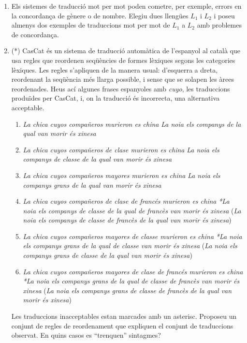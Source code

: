 \begin{enumerate}
\item Els sistemes de traducció mot per mot poden cometre, per
  exemple, errors en la concordança de gènere o de nombre.  Elegiu
  dues llengües $L_1$ i $L_2$ i poseu almenys dos exemples de
  traduccions mot per mot de $L_1$ a $L_2$ amb problemes de
  concordança.

\item (*) \label{ex:cascat} CasCat és un sistema de traducció
  automàtica de l'espanyol al català que usa regles que reordenen
  seqüències de formes lèxiques segons les categories lèxiques. Les
  regles s'apliquen de la manera usual: d'esquerra a dreta, reordenant
  la seqüència més llarga possible, i sense que se solapen les àrees
  reordenades.  Heus ací algunes frases espanyoles amb {\em cuyo}, les
  traduccions produïdes per CasCat, i, on la traducció és incorrecta,
  una alternativa acceptable.
  \begin{enumerate}
  \item \emph{La chica cuyos compañeros murieron es china} \newline
    {\em La noia els companys de la qual van morir és xinesa}
  \item \emph{La chica cuyos compañeros de clase murieron es china}
    \newline \emph{La noia els companys de classe de la qual van morir
      és xinesa}
  \item \emph{La chica cuyos compañeros mayores murieron es china}
    \newline \emph{La noia els companys grans de la qual van morir és
      xinesa}
  \item \emph{La chica cuyos compañeros de clase de francés murieron
      es china} \newline \emph{*La noia els companys de classe de la
      qual de francès van morir és xinesa} \newline (\emph{La noia els
      companys de classe de francès de la qual van morir és xinesa})
  \item \emph{La chica cuyos compañeros mayores de classe murieron es
      china} \newline \emph{*La noia els companys grans de la qual de
      classe van morir és xinesa} \newline (\emph{La noia els companys
      grans de classe de la qual van morir és xinesa})
  \item \emph{La chica cuyos compañeros mayores de clase de francés
      murieron es china} \newline \emph{*La noia els companys grans de
      la qual de classe de francès van morir és xinesa} \newline
    (\emph{La noia els companys grans de classe de francès de la qual
      van morir és xinesa})
  \end{enumerate}
  Les traduccions inacceptables estan marcades amb un asterisc.
  Proposeu un conjunt de regles de reordenament que expliquen el
  conjunt de traduccions observat. En quins casos es ``trenquen''
  sintagmes?


\end{enumerate}
